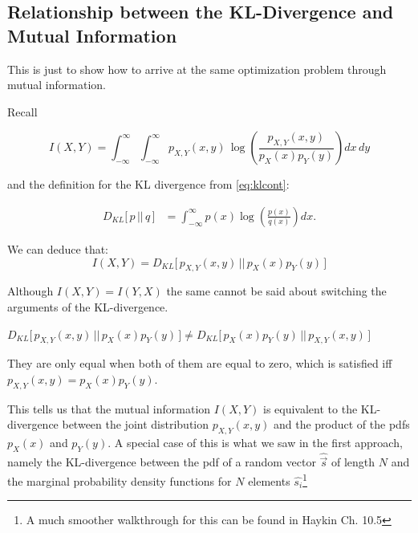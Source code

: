 \newpage

\subsection{Relationship between the KL-Divergence and Mutual Information}

\begin{frame}{\subsecname}


This is just to show how to arrive at the same optimization problem through mutual information.

Recall

\begin{equation*}
I(X,Y) = \int_{-\infty}^{\infty} \int_{-\infty}^{\infty} p_{X,Y}(x,y) \, \log \left(\frac{p_{X,Y}(x,y)}{p_X(x) p_Y(y)}\right) dx \, dy
\end{equation*}

and the definition for the KL divergence from \eqref{eq:klcont}:

\begin{align*}
D_{KL}\lbrack\,p\, ||\, q\,\rbrack 
&= \int_{-\infty}^{\infty} p(x) \log \left( \frac{p(x)}{q(x)} \right) dx.
\end{align*}

\pause

We can deduce that:
$$
I(X,Y) = D_{KL} \lbrack \, p_{X,Y}(x,y) \, || \, p_X(x) p_Y(y) \, \rbrack
$$

Although $I(X,Y) = I(Y,X)$ the same cannot be said about switching the arguments of the KL-divergence.

$
D_{KL} \lbrack \, p_{X,Y}(x,y) \, || \, p_X(x) p_Y(y) \, \rbrack \ne 
D_{KL} \lbrack \, p_X(x) p_Y(y) \, || \, p_{X,Y}(x,y)\, \rbrack
$

They are only equal when both of them are equal to zero, which is satisfied iff $p_{X,Y}(x,y) = p_X(x) p_Y(y)$.

This tells us that the mutual information $I(X,Y)$ is equivalent to the KL-divergence between the joint distribution $p_{X,Y}(x,y)$ and 
the product of the pdfs $p_X(x)$ and $p_Y(y)$. A special case of this is what we saw in the first approach, namely the KL-divergence 
between the pdf of a random vector $\widehat {\vec s}$ of length $N$ and the marginal probability density functions for $N$ elements 
$\widehat{s_i}$\footnote{A much smoother walkthrough for this can be found in 
Haykin Ch. 10.5}

\end{frame}

\clearpage
